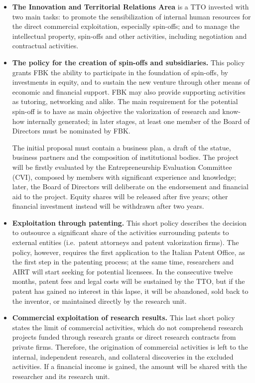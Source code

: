 \begin{itemize}

\item \textbf{The Innovation and Territorial Relations Area} is a TTO invested with two main tasks: to promote the sensibilization of internal human resources for the direct commercial exploitation, especially spin-offs; and to manage the intellectual property, spin-offs and other activities, including negotiation and contractual activities. 

\item \textbf{The policy for the creation of spin-offs and subsidiaries.} This policy grants FBK the ability to participate in the foundation of spin-offs, by investments in equity, and to sustain the new venture through other means of economic and financial support. FBK may also provide supporting activities as tutoring, networking and alike. The main requirement for the potential spin-off is to have as main objective the valorization of research and know-how internally generated; in later stages, at least one member of the Board of Directors must be nominated by FBK.

The initial proposal must contain a business plan, a draft of the statue, business partners and the composition of institutional bodies. The project will be firstly evaluated by the Entrepreneurship Evaluation Committee (CVI), composed by members with significant experience and knowledge; later, the Board of Directors will deliberate on the endorsement and financial aid to the project. Equity shares will be released after five years; other financial investment instead will be withdrawn after two years.

\item \textbf{Exploitation through patenting.} This short policy describes the decision to outsource a significant share of the activities surrounding patents to external entities (i.e.\ patent attorneys and patent valorization firms). The policy, however, requires the first application to the Italian Patent Office, as the first step in the patenting process; at the same time, researchers and AIRT will start seeking for potential licensees. In the consecutive twelve months, patent fees and legal costs will be sustained by the TTO, but if the patent has gained no interest in this lapse, it will be abandoned, sold back to the inventor, or maintained directly by the research unit. 

\item \textbf{Commercial exploitation of research results.} This last short policy states the limit of commercial activities, which do not comprehend research projects funded through research grants or direct research contracts from private firms. Therefore, the origination of commercial activities is left to the internal, independent research, and collateral discoveries in the excluded activities. If a financial income is gained, the amount will be shared with the researcher and its research unit.

\end{itemize}

